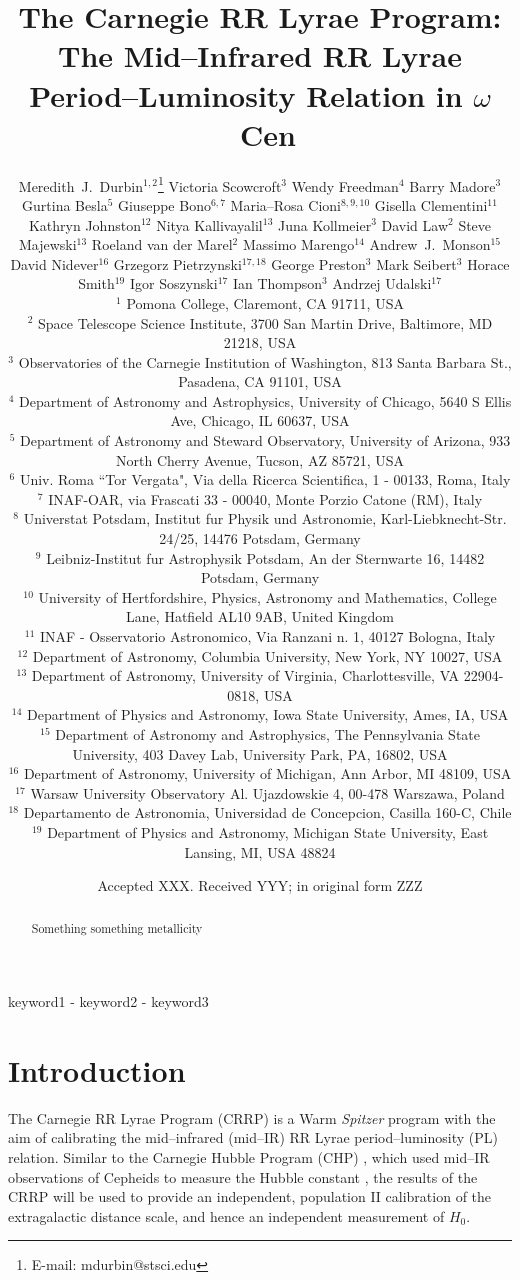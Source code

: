 \documentclass[a4paper,fleqn,usenatbib]{mnras}
\title[Mid--IR RRL PL Relation in $\omega$ Cen]{The Carnegie RR Lyrae Program: The Mid--Infrared RR Lyrae Period--Luminosity Relation in $\omega$~Cen}
\author[M.~J.~Durbin et al.]{Meredith~J.~Durbin$^{1,2}$\thanks{E-mail: mdurbin@stsci.edu}
Victoria Scowcroft$^{3}$
Wendy Freedman$^{4}$
Barry Madore$^{3}$
\newauthor Gurtina Besla$^{5}$ 
Giuseppe Bono$^{6, 7}$
Maria--Rosa Cioni$^{8, 9, 10}$
Gisella Clementini$^{11}$
\newauthor Kathryn Johnston$^{12}$
Nitya Kallivayalil$^{13}$
Juna Kollmeier$^{3}$
David Law$^{2}$
Steve Majewski$^{13}$
\newauthor Roeland van der Marel$^{2}$
Massimo Marengo$^{14}$
Andrew~J.~Monson$^{15}$
David Nidever$^{16}$ 
\newauthor
Grzegorz Pietrzynski$^{17, 18}$
George Preston$^{3}$
Mark Seibert$^{3}$
Horace Smith$^{19}$
\newauthor Igor Soszynski$^{17}$
Ian Thompson$^{3}$
Andrzej Udalski$^{17}$
\\
$^1$ Pomona College, Claremont, CA 91711, USA \\
$^2$ Space Telescope Science Institute, 3700 San Martin Drive, Baltimore, MD 21218, USA \\
$^3$ Observatories of the Carnegie Institution of Washington, 813 Santa Barbara St., Pasadena, CA 91101, USA \\
$^4$ Department of Astronomy and Astrophysics, University of Chicago, 5640 S Ellis Ave, Chicago, IL 60637, USA \\
$^5$ Department of Astronomy and Steward Observatory, University of Arizona, 933 North Cherry Avenue,   Tucson, AZ 85721, USA \\
$^6$ Univ. Roma ``Tor Vergata", Via della Ricerca Scientifica, 1 - 00133, Roma, Italy \\
$^7$ INAF-OAR, via Frascati 33 - 00040, Monte Porzio Catone (RM), Italy \\
$^8$ Universtat Potsdam, Institut fur Physik und Astronomie, Karl-Liebknecht-Str. 24/25, 14476 Potsdam, Germany \\
$^9$ Leibniz-Institut fur Astrophysik Potsdam, An der Sternwarte 16, 14482 Potsdam, Germany \\
$^{10}$ University of Hertfordshire, Physics, Astronomy and Mathematics, College Lane, Hatfield AL10 9AB, United Kingdom \\
$^{11}$ INAF - Osservatorio Astronomico, Via Ranzani n. 1, 40127 Bologna, Italy \\
$^{12}$ Department of Astronomy, Columbia University, New York, NY 10027, USA  \\
$^{13}$ Department of Astronomy, University of Virginia, Charlottesville, VA 22904-0818, USA \\
$^{14}$ Department of Physics and Astronomy, Iowa State University, Ames, IA, USA \\
$^{15}$ Department of Astronomy and Astrophysics, The Pennsylvania State University, 403 Davey Lab, University Park, PA, 16802, USA \\
$^{16}$ Department of Astronomy, University of Michigan, Ann Arbor, MI 48109, USA \\
$^{17}$ Warsaw University Observatory Al. Ujazdowskie 4, 00-478 Warszawa, Poland \\
$^{18}$ Departamento de Astronomia, Universidad de Concepcion, Casilla 160-C, Chile \\
$^{19}$ Department of Physics and Astronomy, Michigan State University, East Lansing, MI, USA 48824 \\
}
\date{Accepted XXX. Received YYY; in original form ZZZ}
\begin{document}
\label{firstpage}
\pagerange{\pageref{firstpage}-\pageref{lastpage}}
\maketitle

\begin{abstract}
Something something metallicity
\end{abstract}

\begin{keywords}
keyword1 - keyword2 - keyword3
\end{keywords}






\section{Introduction}
\label{sec:intro}

The Carnegie RR Lyrae Program (CRRP) is a Warm {\it Spitzer} program \citep[][PID 90002]{2012sptz.prop90002F} with the aim of calibrating the mid--infrared (mid--IR) RR Lyrae period--luminosity (PL) relation. Similar to the Carnegie Hubble Program (CHP) \citep{2011AJ....142..192F}, which used mid--IR observations of Cepheids to measure the Hubble constant \citep[$H_{0}$][]{2012ApJ...758...24F}, the results of the CRRP will be used to provide an independent, population II calibration of the extragalactic distance scale, and hence an independent measurement of $H_{0}$. 
\end{document}
